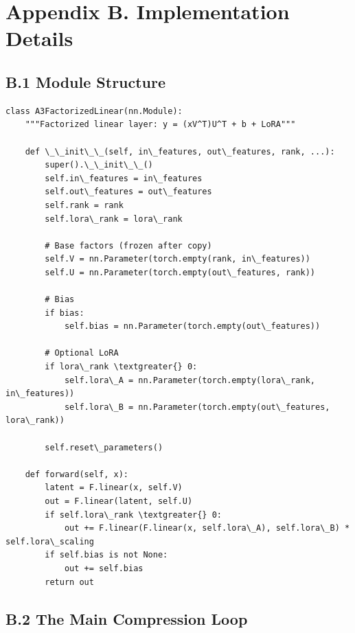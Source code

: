 
\section{Appendix B. Implementation Details}

\subsection{B.1 Module Structure}

\begin{lstlisting}
class A3FactorizedLinear(nn.Module):
    """Factorized linear layer: y = (xV^T)U^T + b + LoRA"""
    
    def \_\_init\_\_(self, in\_features, out\_features, rank, ...):
        super().\_\_init\_\_()
        self.in\_features = in\_features
        self.out\_features = out\_features
        self.rank = rank
        self.lora\_rank = lora\_rank
        
        # Base factors (frozen after copy)
        self.V = nn.Parameter(torch.empty(rank, in\_features))
        self.U = nn.Parameter(torch.empty(out\_features, rank))
        
        # Bias
        if bias:
            self.bias = nn.Parameter(torch.empty(out\_features))
        
        # Optional LoRA
        if lora\_rank \textgreater{} 0:
            self.lora\_A = nn.Parameter(torch.empty(lora\_rank, in\_features))
            self.lora\_B = nn.Parameter(torch.empty(out\_features, lora\_rank))
        
        self.reset\_parameters()
    
    def forward(self, x):
        latent = F.linear(x, self.V)
        out = F.linear(latent, self.U)
        if self.lora\_rank \textgreater{} 0:
            out += F.linear(F.linear(x, self.lora\_A), self.lora\_B) * self.lora\_scaling
        if self.bias is not None:
            out += self.bias
        return out
\end{lstlisting}

\subsection{B.2 The Main Compression Loop}


